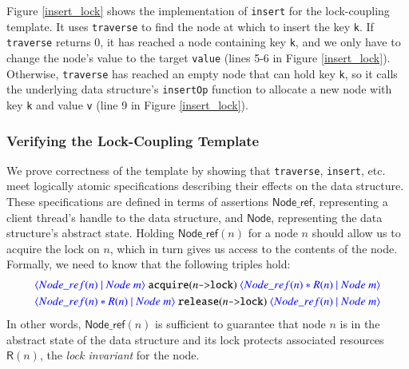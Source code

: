 \documentclass[a4paper,UKenglish,cleveref, autoref, thm-restate]{lipics-v2021}
\newcommand{\treerep}{\ensuremath{\mathsf{Node}}}
\newcommand{\nodeboxrep}{\ensuremath{\mathsf{Node\_ref}}}
\begin{document}

Figure \ref{insert_lock} shows the implementation of \lstinline{insert} for the lock-coupling template.
It uses \texttt{traverse} to find the node at which to insert the key \lstinline{k}. If \texttt{traverse} returns 0, it has reached a node containing key \texttt{k}, and we only have to change the node's value to the target \texttt{value} (lines 5-6 in Figure \ref{insert_lock}). Otherwise, \texttt{traverse} has reached an empty node that can hold key \texttt{k}, so it calls the underlying data structure's \texttt{insertOp} function to allocate a new node with key \texttt{k} and value \texttt{v} (line 9 in Figure \ref{insert_lock}).

\subsubsection{Verifying the Lock-Coupling Template}
\label{traverse_proof_lock}

We prove correctness of the template by showing that \lstinline{traverse}, \lstinline{insert}, etc. meet logically atomic specifications describing their effects on the data structure. These specifications are defined in terms of assertions $\nodeboxrep$, representing a client thread's handle to the data structure, and $\treerep$, representing the data structure's abstract state. Holding $\nodeboxrep(n)$ for a node $n$ should allow us to acquire the lock on $n$, which in turn gives us access to the contents of the node. Formally, we need to know that the following triples hold:
\begin{align*}
&{\color{blue}\left\langle \nodeboxrep(n) \ |\ \treerep\ m \right\rangle}\ \texttt{acquire}(n\texttt{->lock})\ {\color{blue}\left\langle \nodeboxrep(n) \ast \mathsf{R}(n) \ |\ \treerep\ m\right\rangle}\\
&{\color{blue}\left\langle \nodeboxrep(n) \ast \mathsf{R}(n) \ |\ \treerep\ m \right\rangle}\ \texttt{release}(n\texttt{->lock})\ {\color{blue}\left\langle \nodeboxrep(n) \ |\ \treerep\ m\right\rangle}
\end{align*}
In other words, $\nodeboxrep(n)$ is sufficient to guarantee that node $n$ is in the abstract state of the data structure and its lock protects associated resources $\mathsf{R}(n)$, the \emph{lock invariant} for the node. 
\end{document}
